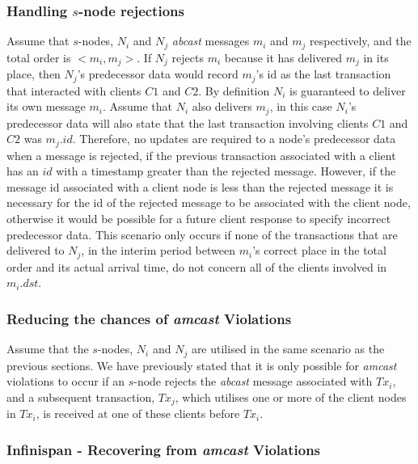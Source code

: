     \subsubsection*{Handling $s$-node rejections}
    Assume that $s$-nodes, $N_i$ and $N_j$ \emph{abcast} messages $m_i$ and $m_j$ respectively, and the total order is $<m_i, m_j>$.  If $N_j$ rejects $m_i$ because it has delivered $m_j$ in its place, then $N_j$'s predecessor data would record $m_j$'s id as the last transaction that interacted with clients $C1$ and $C2$.  By definition $N_i$ is guaranteed to deliver its own message $m_i$.  Assume that $N_i$ also delivers $m_j$, in this case $N_i$'s predecessor data will also state that the last transaction involving clients $C1$ and $C2$ was $m_j.id$.  Therefore, no updates are required to a node's predecessor data when a message is rejected, if the previous transaction associated with a client has an $id$ with a timestamp greater than the rejected message.  However, if the message id associated with a client node is less than the rejected message it is necessary for the id of the rejected message to be associated with the client node, otherwise it would be possible for a future client response to specify incorrect predecessor data.  This scenario only occurs if none of the transactions that are delivered to $N_j$, in the interim period between $m_i$'s correct place in the total order and its actual arrival time, do not concern all of the clients involved in $m_i.dst$.  
    
        
    \subsubsection*{Reducing the chances of \emph{amcast} Violations}
    Assume that the $s$-nodes, $N_i$ and $N_j$ are utilised in the same scenario as the previous sections.  We have previously stated that it is only possible for \emph{amcast} violations to occur if an $s$-node rejects the \emph{abcast} message associated with $Tx_i$, and a subsequent transaction, $Tx_j$, which utilises one or more of the client nodes in $Tx_i$, is received at one of these clients before $Tx_i$.  
    
    \subsubsection*{Infinispan - Recovering from \emph{amcast} Violations}



